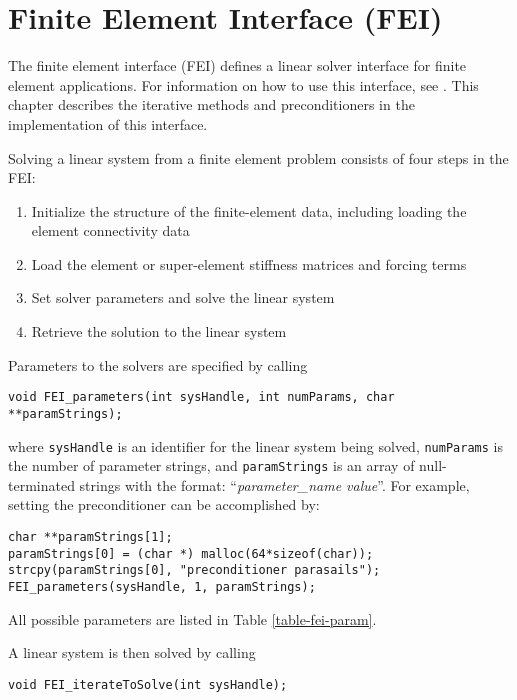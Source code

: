 \chapter{Finite Element Interface (FEI)}
\label{Finite Element Interface}

The finite element interface (FEI) defines a linear solver interface 
for finite element applications.  For information on how to use this
interface, see \cite{FEI-ref}.  
This chapter describes the iterative methods and 
preconditioners in the \hypre{} implementation
of this interface.

Solving a linear system from a finite element problem consists of
four steps in the FEI:
\begin{enumerate}
\item Initialize the structure of the finite-element data,
      including loading the element connectivity data
\item Load the element or super-element stiffness matrices and forcing terms
\item Set solver parameters and solve the linear system
\item Retrieve the solution to the linear system
\end{enumerate}

Parameters to the \hypre{} solvers are specified by calling
\begin{display}
\begin{verbatim}
void FEI_parameters(int sysHandle, int numParams, char **paramStrings);
\end{verbatim}
\end{display}
where {\tt sysHandle} is an identifier for the linear system being solved,
{\tt numParams} is the number of parameter strings, and {\tt paramStrings} is
an array of null-terminated strings with the format: 
``{\em parameter\_name value}''.
For example, setting the preconditioner can be accomplished by:
\begin{display}
\begin{verbatim}
char **paramStrings[1];
paramStrings[0] = (char *) malloc(64*sizeof(char));
strcpy(paramStrings[0], "preconditioner parasails");
FEI_parameters(sysHandle, 1, paramStrings);
\end{verbatim}
\end{display}
All possible parameters are listed in Table \ref{table-fei-param}.


A linear system is then solved by calling 
\begin{display}
\begin{verbatim}
void FEI_iterateToSolve(int sysHandle);
\end{verbatim}
\end{display}

